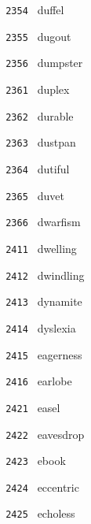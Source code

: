 \documentclass[11pt]{article}
\begin{document}
\begin{multicols}{6}
\noindent \texttt{ 2354 } \hspace{1mm} duffel  \par
\noindent \texttt{ 2355 } \hspace{1mm} dugout  \par
\noindent \texttt{ 2356 } \hspace{1mm} dumpster  \par
\noindent \texttt{ 2361 } \hspace{1mm} duplex  \par
\noindent \texttt{ 2362 } \hspace{1mm} durable  \par
\noindent \texttt{ 2363 } \hspace{1mm} dustpan  \par
\noindent \texttt{ 2364 } \hspace{1mm} dutiful  \par
\noindent \texttt{ 2365 } \hspace{1mm} duvet  \par
\noindent \texttt{ 2366 } \hspace{1mm} dwarfism  \par
\noindent \texttt{ 2411 } \hspace{1mm} dwelling  \par
\noindent \texttt{ 2412 } \hspace{1mm} dwindling  \par
\noindent \texttt{ 2413 } \hspace{1mm} dynamite  \par
\noindent \texttt{ 2414 } \hspace{1mm} dyslexia  \par
\noindent \texttt{ 2415 } \hspace{1mm} eagerness  \par
\noindent \texttt{ 2416 } \hspace{1mm} earlobe  \par
\noindent \texttt{ 2421 } \hspace{1mm} easel  \par
\noindent \texttt{ 2422 } \hspace{1mm} eavesdrop  \par
\noindent \texttt{ 2423 } \hspace{1mm} ebook  \par
\noindent \texttt{ 2424 } \hspace{1mm} eccentric  \par
\noindent \texttt{ 2425 } \hspace{1mm} echoless  \par

\end{multicols}
\end{document}
